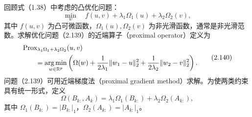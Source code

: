 回顾式（1.38）中考虑的凸优化问题：
\[
\min_w\quad f(u,v)+\lambda_1\Omega_1(u)+\lambda_2\Omega_2(v),
\]
其中 $f(u,v)$ 为凸可微函数，$\Omega_1(u),\Omega_2(v)$ 为非光滑函数，通常是非光滑范数。求解优化问题（2.139）的近端算子（proximal operator）定义为
\begin{equation}
\begin{aligned}
&\operatorname{Prox}_{\lambda_1\Omega_1+\lambda_2\Omega_2}(u,v)\\
&\qquad=\operatorname*{arg\,min}_{w\in\mathbb{R}^p}
\left(\Omega(w)+\frac1{2\lambda_1}\lVert w_1-u\rVert_2^2
+\frac1{2\lambda_2}\lVert w_2-v\rVert_2^2\right).
\end{aligned}\tag{2.140}
\end{equation}
问题（2.139）可用近端梯度法（proximal gradient method）求解。为使两类约束具有统一形式，定义
\begin{equation}
\Omega(B_{k:},A_k)=
\lambda_1\Omega_1(B_{k:})+\lambda_2\Omega_2(A_{k:}),
\tag{2.141}
\end{equation}
其中 $\Omega_1(B_{k:})=|B_{k:}|_1$，$\Omega_2(A_{k:})=|A_{k:}|_1$。

